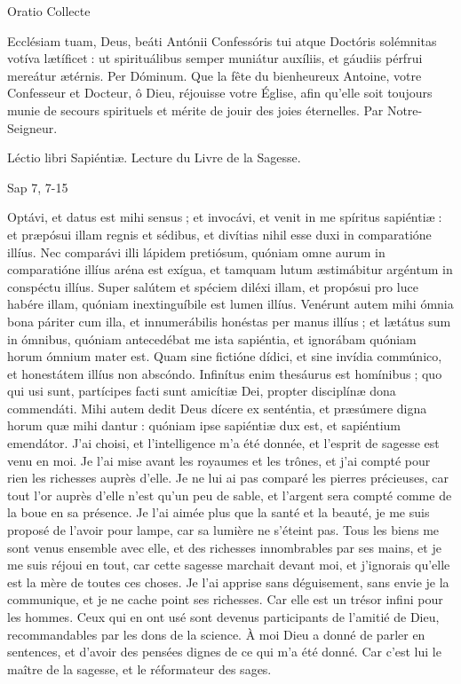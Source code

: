 \begin{paracol}{2}
Oratio
\switchcolumn
Collecte
\switchcolumn*

Ecclésiam tuam, Deus, beáti  Antónii Confessóris tui atque Doctóris solémnitas votíva lætíficet : ut spirituálibus semper muniátur auxíliis, et gáudiis pérfrui mereátur ætérnis. Per Dóminum.
\switchcolumn
Que la fête du bienheureux Antoine,  votre Confesseur et Docteur, ô Dieu, réjouisse votre Église, afin qu’elle soit toujours munie de secours spirituels et mérite de jouir des joies éternelles. Par Notre-Seigneur.
\switchcolumn*

Léctio libri Sapiéntiæ.
\switchcolumn
Lecture du Livre de la Sagesse.
\switchcolumn*

Sap 7, 7-15
\switchcolumn

\switchcolumn*

Optávi, et datus est mihi sensus ; et invocávi, et venit in me spíritus sapiéntiæ : et præpósui illam regnis et sédibus, et divítias nihil esse duxi in comparatióne illíus. Nec comparávi illi lápidem pretiósum, quóniam omne aurum in comparatióne illíus aréna est exígua, et tamquam lutum æstimábitur argéntum in conspéctu illíus. Super salútem et spéciem diléxi illam, et propósui pro luce habére illam, quóniam inextinguíbile est lumen illíus. Venérunt autem mihi ómnia bona páriter cum illa, et innumerábilis honéstas per manus illíus ; et lætátus sum in ómnibus, quóniam antecedébat me ista sapiéntia, et ignorábam quóniam horum ómnium mater est. Quam sine fictióne dídici, et sine invídia commúnico, et honestátem illíus non abscóndo. Infinítus enim thesáurus est homínibus ; quo qui usi sunt, partícipes facti sunt amicítiæ Dei, propter disciplínæ dona commendáti. Mihi autem dedit Deus dícere ex senténtia, et præsúmere digna horum quæ mihi dantur : quóniam ipse sapiéntiæ dux est, et sapiéntium emendátor.
\switchcolumn
J’ai choisi, et l’intelligence m’a été donnée, et l’esprit de sagesse est venu en moi. Je l’ai mise avant les royaumes et les trônes, et j’ai compté pour rien les richesses auprès d’elle. Je ne lui ai pas comparé les pierres précieuses, car tout l’or auprès d’elle n’est qu’un peu de sable, et l’argent sera compté comme de la boue en sa présence. Je l’ai aimée plus que la santé et la beauté, je me suis proposé de l’avoir pour lampe, car sa lumière ne s’éteint pas. Tous les biens me sont venus ensemble avec elle, et des richesses innombrables par ses mains, et je me suis réjoui en tout, car cette sagesse marchait devant moi, et j’ignorais qu’elle est la mère de toutes ces choses. Je l’ai apprise sans déguisement, sans envie je la communique, et je ne cache point ses richesses. Car elle est un trésor infini pour les hommes. Ceux qui en ont usé sont devenus participants de l’amitié de Dieu, recommandables par les dons de la science. À moi Dieu a donné de parler en sentences, et d’avoir des pensées dignes de ce qui m’a été donné. Car c’est lui le maître de la sagesse, et le réformateur des sages.
\switchcolumn*


\end{paracol}
